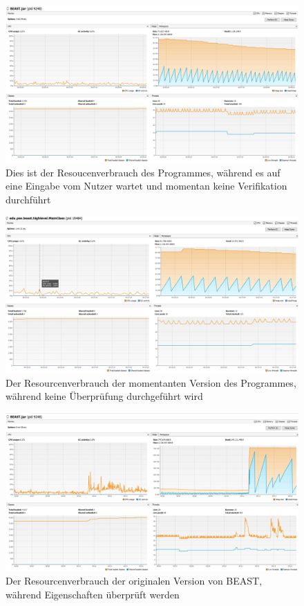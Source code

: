 \documentclass[a4paper]{scrreprt}
\begin{document}
\newpage
\begin{figure}[ht]
	\centering
  \includegraphics[width=1.0\textwidth,
  height=0.40\textwidth]{images/OLD_NO.png} \caption{Dies ist der
  Resoucenverbrauch des Programmes, während es auf eine Eingabe vom Nutzer wartet und momentan keine Verifikation durchführt}
	\label{fig1}
\end{figure}

\vspace{4cm}

\begin{figure}[ht]
	\centering
  \includegraphics[width=1.0\textwidth,
  height=0.40\textwidth]{images/NEW_NO.png} \caption{Der Resourcenverbrauch der
  momentanten Version des Programmes, während keine Überprüfung durchgeführt wird}
	\label{fig2}
\end{figure}


\newpage

\begin{figure}[ht]
	\centering
  \includegraphics[width=1.0\textwidth,
  height=0.4\textwidth]{images/OLD_YES.png} \caption{Der Resourcenverbrauch
 der originalen Version von BEAST, während Eigenschaften überprüft werden}
	\label{fig3}
\end{figure}
\end{document}
